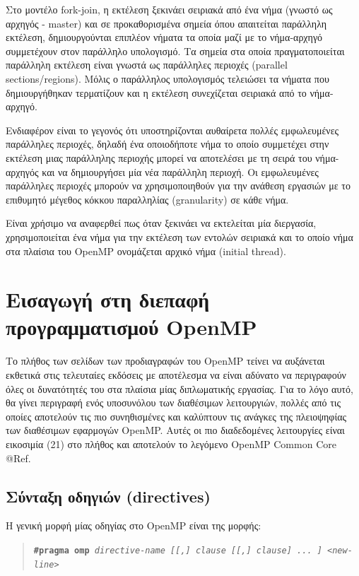 Στο μοντέλο fork-join, η εκτέλεση ξεκινάει σειριακά από ένα νήμα (γνωστό ως αρχηγός - master) και σε προκαθορισμένα σημεία όπου απαιτείται παράλληλη εκτέλεση, δημιουργούνται επιπλέον νήματα τα οποία μαζί με το νήμα-αρχηγό συμμετέχουν στον παράλληλο υπολογισμό. Τα σημεία στα οποία πραγματοποιείται παράλληλη εκτέλεση είναι γνωστά ως παράλληλες περιοχές (parallel sections/regions). Μόλις ο παράλληλος υπολογισμός τελειώσει τα νήματα που δημιουργήθηκαν τερματίζουν και η εκτέλεση συνεχίζεται σειριακά από το νήμα-αρχηγό.

Ενδιαφέρον είναι το γεγονός ότι υποστηρίζονται αυθαίρετα πολλές εμφωλευμένες παράλληλες περιοχές, δηλαδή ένα οποιοδήποτε νήμα το οποίο συμμετέχει στην εκτέλεση μιας παράλληλης περιοχής μπορεί να αποτελέσει με τη σειρά του νήμα-αρχηγός και να δημιουργήσει μία νέα παράλληλη περιοχή. Οι εμφωλευμένες παράλληλες περιοχές μπορούν να χρησιμοποιηθούν για την ανάθεση εργασιών με το επιθυμητό μέγεθος κόκκου παραλληλίας (granularity) σε κάθε νήμα.

Είναι χρήσιμο να αναφερθεί πως όταν ξεκινάει να εκτελείται μία διεργασία, χρησιμοποιείται ένα νήμα για την εκτέλεση των εντολών σειριακά και το οποίο νήμα στα πλαίσια του OpenMP ονομάζεται αρχικό νήμα (initial thread).

\section{Εισαγωγή στη διεπαφή προγραμματισμού OpenMP}

Το πλήθος των σελίδων των προδιαγραφών του OpenMP τείνει να αυξάνεται εκθετικά στις τελευταίες εκδόσεις με αποτέλεσμα να είναι αδύνατο να περιγραφούν όλες οι δυνατότητές του στα πλαίσια μίας διπλωματικής εργασίας. Για το λόγο αυτό, θα γίνει περιγραφή ενός υποσυνόλου των διαθέσιμων λειτουργιών, πολλές από τις οποίες αποτελούν τις πιο συνηθισμένες και καλύπτουν τις ανάγκες της πλειοψηφίας των διαθέσιμων εφαρμογών OpenMP. Αυτές οι πιο διαδεδομένες λειτουργίες είναι εικοσιμία (21) στο πλήθος και αποτελούν το λεγόμενο OpenMP Common Core @Ref.

\subsection{Σύνταξη οδηγιών (directives)}
Η γενική μορφή μίας οδηγίας στο OpenMP είναι της μορφής:

\begin{quote}
	\texttt{\textbf{\#pragma omp} \textit{directive-name [[,] clause [[,] clause] ... ] <new-line>}}
\end{quote}

